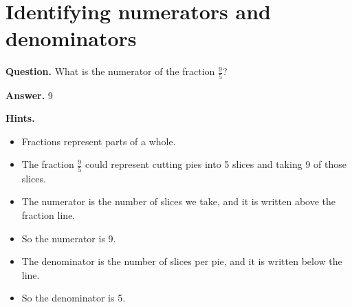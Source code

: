 \documentclass{article}
\begin{document}
\section*{Identifying numerators and denominators}
\textbf{Question.} What is the numerator of the fraction $\frac{9}{5}$?

\textbf{Answer.} 9

\textbf{Hints.}
\begin{itemize}
  \item Fractions represent parts of a whole.
  \item The fraction $\frac{9}{5}$
                            could represent cutting pies into 5 slices and
                            taking 9 of those slices.
  \item The numerator is the number of slices we take, and it is written above the fraction line.
  \item So the numerator is 9.
  \item The denominator is the number of slices per pie, and it is written below the line.
  \item So the denominator is 5.
\end{itemize}
\end{document}
